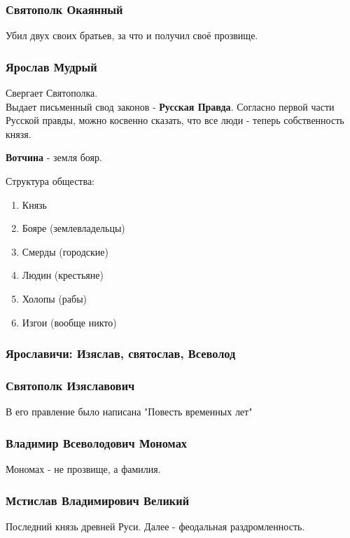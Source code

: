 \subsubsection*{Святополк Окаянный}

Убил двух своих братьев, за что и получил своё прозвище.

\subsubsection*{Ярослав Мудрый}

Свергает Святополка. \\
Выдает письменный свод законов - \textbf{Русская Правда}.
Согласно первой части Русской правды, можно косвенно сказать, что все люди - теперь собственность князя. 

\textbf{Вотчина} - земля бояр.

Структура общества:
\begin{enumerate}
  \item Князь
  \item Бояре (землевладельцы)
  \item Смерды (городские)
  \item Людин (крестьяне)
  \item Холопы (рабы)
  \item Изгои (вообще никто)
\end{enumerate}

\subsubsection*{Ярославичи: Изяслав, святослав, Всеволод}

\subsubsection*{Святополк Изяславович}

В его правление было написана "Повесть временных лет"

\subsubsection*{Владимир Всеволодович Мономах}

Мономах - не прозвище, а фамилия.

\subsubsection*{Мстислав Владимирович Великий}

Последний князь древней Руси. Далее - феодальная раздромленность.

